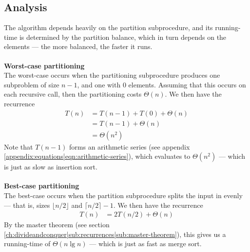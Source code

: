 \subsection{Analysis}
The algorithm depends heavily on the partition subprocedure, and its
running-time is determined by the partition balance, which in turn depends on
the elements --- the more balanced, the faster it runs.
\\\\
\noindent \textbf{Worst-case partitioning} \\
The worst-case occurs when the partitioning subprocedure produces one
subproblem of size $n - 1$, and one with $0$ elements. Assuming that this
occurs on each recursive call, then the partitioning costs $\Theta(n)$. We
then have the recurrence
\begin{align}
	T(n) &= T(n-1) + T(0) + \Theta(n) \\ &= T(n-1) + \Theta(n) \\ &= \Theta(n^2)
\end{align}
Note that $T(n-1)$ forms an arithmetic series (see appendix
\ref{appendix:equations|eqn:arithmetic-series}), which evaluates to
$\Theta(n^2)$ --- which is just as slow as insertion sort.
\\\\
\noindent \textbf{Best-case partitioning} \\
The best-case occurs when the partition subprocedure splits the input in
evenly --- that is, sizes $\lfloor n/2 \rfloor$ and $\lceil n/2 \rceil - 1$.
We then have the recurrence
\begin{align}
	T(n) &= 2T(n/2) + \Theta(n)
\end{align}
By the master theorem (see section
\ref{ch:divideandconquer|sub:recurrences|sub:master-theorem}), this gives us a
running-time of $\Theta(n \lg n)$ --- which is just as fast as merge sort.
